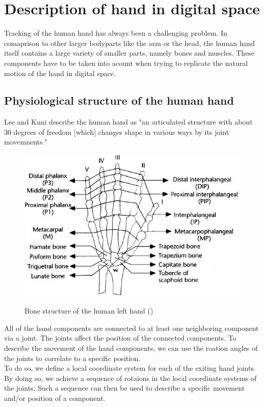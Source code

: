 \chapter{Description of hand in digital space}
Tracking of the human hand has always been a challenging problem. In comaprison to other larger bodyparts like the arm or the head, the human hand itself contains a large variety of smaller parts, namely bones and muscles. These components have to be taken into acount when trying to replicate the natural motion of the hand in digital space.\\
\section{Physiological structure of the human hand}
\label{p}
Lee and Kuni \citep{LEE.1995} describe the human hand as "an articulated structure with about 30 degrees of freedom [which] changes shape in various ways by its joint movemnents."
\begin{figure}[H]
	\includegraphics[scale=0.8]{images/hand.jpg}
	\label{Handstructure} 
	\caption{Bone structure of the human left hand (\cite{LEE.1995})}
\end{figure}
All of the hand components are connected to at least one neighboring component via a joint. The joints affect the position of the connected components. To describe the movement of the hand components, we can use the roation angles of the joints to correlate to a specific position.\\
To do so, we define a local coordinate system for each of the exiting hand joints. By doing so, we achieve a sequence of rotaions in the local coordinate systems of the joints. Such a sequence can then be used to describe a specific movement and/or position of a component.

